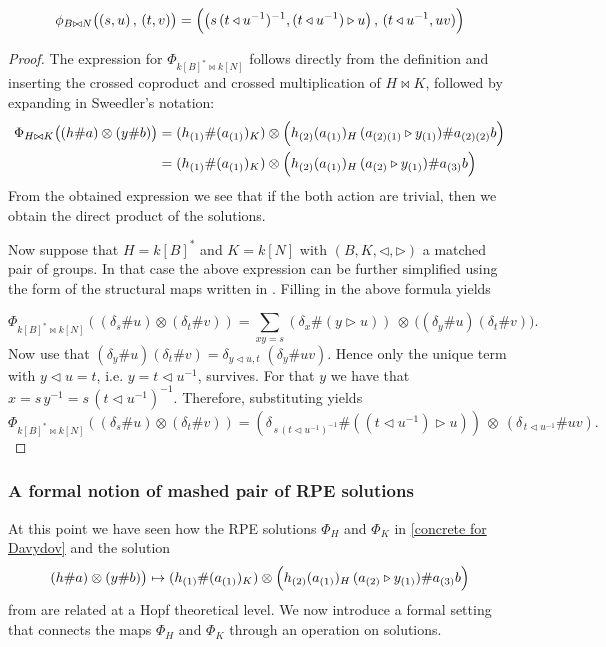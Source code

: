 \documentclass[a4paper,10pt]{amsart}
\theoremstyle{definition}
\theoremstyle{remark}
\newcommand\triangler{\triangleright}
\newcommand\trianglel{\triangleleft}
\newcommand\ot{\otimes}
\begin{document}
\begin{equation}\label{set mashed pair}
\phi_{B\bowtie N}\bigl((s,u)\, ,\, (t,v)\bigr)
=
\Bigl( \bigl(s\,(t\triangleleft u^{-1})^{-1}, (t\triangleleft u^{-1})\triangleright u\bigr) \, , \,
(t\triangleleft u^{-1},  uv ) \Bigr)
\end{equation}
\begin{proof}
The expression for $\Phi_{k[B]^* \bowtie k[N]}$ follows directly from the definition and inserting the crossed coproduct and crossed multiplication of $H\bowtie K$, followed by expanding in Sweedler's notation:
\begin{align*}
\Phi_{H\bowtie K}\bigl((h\# a)\otimes (y\# b)\bigr)
 & =
(h_{(1)}\# (a_{(1)})_K)\otimes
\Bigl(
h_{(2)}(a_{(1)})_H\,(a_{(2)(1)}\triangler y_{(1)})\# a_{(2)(2)}b
\Bigr) \\
 & =
(h_{(1)}\# (a_{(1)})_K)\otimes
\Bigl(
h_{(2)}(a_{(1)})_H\,(a_{(2)}\triangler y_{(1)})\# a_{(3)}b
\Bigr) 
\end{align*}
From the obtained expression we see that if the both action are trivial, then we obtain the direct product of the solutions.

Now suppose that $H = k[B]^*$ and $K= k[N]$ with $(B,K,\trianglel, \triangler)$ a matched pair of groups. In that case the above expression can be further simplified using the form of the structural maps written in . Filling in the above formula yields

$$
\Phi_{k[B]^* \bowtie k[N]}( (\delta_s\# u) \ot (\delta_t\# v))
=\sum_{xy=s} (\delta_x\# (y\triangleright u))\ \otimes\ \bigl((\delta_y\# u)(\delta_t\# v)\bigr).
$$
Now use that $ (\delta_y\# u)(\delta_t\# v)=\delta_{y\triangleleft u, t}\;(\delta_y\# uv)$. Hence only the unique term with $y\triangleleft u=t$, i.e. $y = t\triangleleft u^{-1}$, survives. For that $y$ we have that $x=s\,y^{-1} = s\,(t\triangleleft u^{-1})^{-1}.$ Therefore, substituting yields
\[
\Phi_{k[B]^* \bowtie k[N]}( (\delta_s\# u) \ot (\delta_t\# v))
=
(\delta_{\,s\,(t\triangleleft u^{-1})^{-1}}\# ((t\triangleleft u^{-1})\triangleright u))
\ \otimes\
(\delta_{\,t\triangleleft u^{-1}}\# uv).
\]
\end{proof}

\subsubsection{A formal notion of mashed pair of RPE solutions}
At this point we have seen how the RPE solutions $\Phi_H$ and $\Phi_K$ in \eqref{concrete for Davydov} and the solution 
$$(h\# a)\otimes (y\# b)\bigr)
\mapsto 
(h_{(1)}\# (a_{(1)})_K)\otimes
\Bigl(
h_{(2)}(a_{(1)})_H\,(a_{(2)}\triangler y_{(1)})\# a_{(3)}b
\Bigr)$$
from   are related at a Hopf theoretical level. We now introduce a formal setting that connects the maps $\Phi_H$ and $\Phi_K$ through an operation on solutions. 
\end{document}
